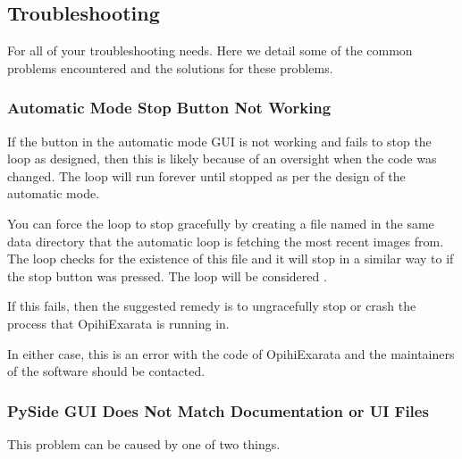 \documentclass[letterpaper,11pt,english]{sphinxmanual}
\begin{document}
\sphinxstepscope


\subsection{Troubleshooting}
\label{\detokenize{user/troubleshooting:troubleshooting}}\label{\detokenize{user/troubleshooting:user-troubleshooting}}\label{\detokenize{user/troubleshooting::doc}}
\sphinxAtStartPar
For all of your troubleshooting needs. Here we detail some of the common
problems encountered and the solutions for these problems.


\subsubsection{Automatic Mode Stop Button Not Working}
\label{\detokenize{user/troubleshooting:automatic-mode-stop-button-not-working}}\label{\detokenize{user/troubleshooting:user-troubleshooting-automatic-mode-stop-button-not-working}}
\sphinxAtStartPar
If the  button in the automatic mode GUI is not working and fails to
stop the loop as designed, then this is likely because of an oversight when
the code was changed. The loop will run forever until stopped as per the
design of the automatic mode.

\sphinxAtStartPar
You can force the loop to stop gracefully by creating a file named
 in the same data directory that the automatic
loop is fetching the most recent images from. The loop checks for the
existence of this file and it will stop in a similar way to if the stop button
was pressed. The loop will be considered .

\sphinxAtStartPar
If this fails, then the suggested remedy is to ungracefully stop or crash the
process that OpihiExarata is running in.

\sphinxAtStartPar
In either case, this is an error with the code of OpihiExarata and the
maintainers of the software should be contacted.


\subsubsection{PySide GUI Does Not Match Documentation or UI Files}
\label{\detokenize{user/troubleshooting:pyside-gui-does-not-match-documentation-or-ui-files}}\label{\detokenize{user/troubleshooting:user-troubleshooting-pyside-gui-does-not-match-documentation-or-ui-files}}
\sphinxAtStartPar
This problem can be caused by one of two things.
\end{document}
